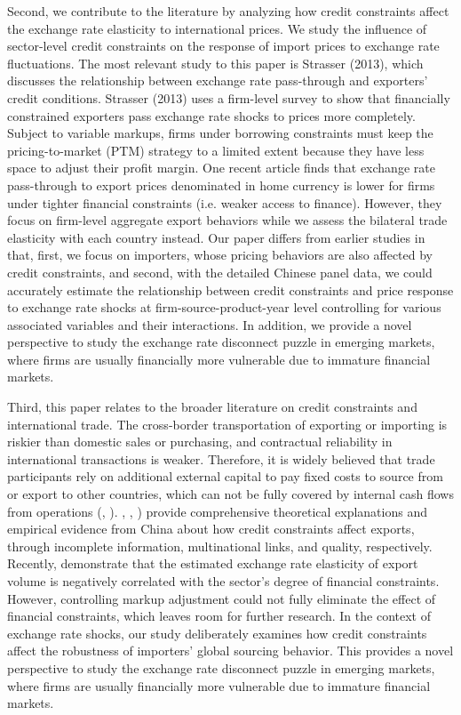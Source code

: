 \documentclass[12pt]{article}
\begin{document}
Second, we contribute to the literature by analyzing how credit constraints affect the exchange rate elasticity to international prices. We study the influence of sector-level credit constraints on the response of import prices to exchange rate fluctuations. The most relevant study to this paper is Strasser (2013), which discusses the relationship between exchange rate pass-through and exporters' credit conditions. Strasser (2013) uses a firm-level survey to show that financially constrained exporters pass exchange rate shocks to prices more completely. Subject to variable markups, firms under borrowing constraints must keep the pricing-to-market (PTM) strategy to a limited extent because they have less space to adjust their profit margin. One recent article \cite{dai2021} finds that exchange rate pass-through to export prices denominated in home currency is lower for firms under tighter financial constraints (i.e. weaker access to finance). However, they focus on firm-level aggregate export behaviors while we assess the bilateral trade elasticity with each country instead. Our paper differs from earlier studies in that, first, we focus on importers, whose pricing behaviors are also affected by credit constraints, and second, with the detailed Chinese panel data, we could accurately estimate the relationship between credit constraints and price response to exchange rate shocks at firm-source-product-year level controlling for various associated variables and their interactions. In addition, we provide a novel perspective to study the exchange rate disconnect puzzle in emerging markets, where firms are usually financially more vulnerable due to immature financial markets.

Third, this paper relates to the broader literature on credit constraints and international trade. The cross-border transportation of exporting or importing is riskier than domestic sales or purchasing, and contractual reliability in international transactions is weaker. Therefore, it is widely believed that trade participants rely on additional external capital to pay fixed costs to source from or export to other countries, which can not be fully covered by internal cash flows from operations (\cite{manova2013}, \cite{chaney2016}). \cite{feenstra-li-yu2014}, \cite{manova-wei-zhang2015}, \cite{fan-lai-li2015}) provide comprehensive theoretical explanations and empirical evidence from China about how credit constraints affect exports, through incomplete information, multinational links, and quality, respectively. Recently, \cite{xu-guo2021} demonstrate that the estimated exchange rate elasticity of export volume is negatively correlated with the sector’s degree of financial constraints. However, controlling markup adjustment could not fully eliminate the effect of financial constraints, which leaves room for further research. In the context of exchange rate shocks, our study deliberately examines how credit constraints affect the robustness of importers' global sourcing behavior. This provides a novel perspective to study the exchange rate disconnect puzzle in emerging markets, where firms are usually financially more vulnerable due to immature financial markets.
\end{document}
